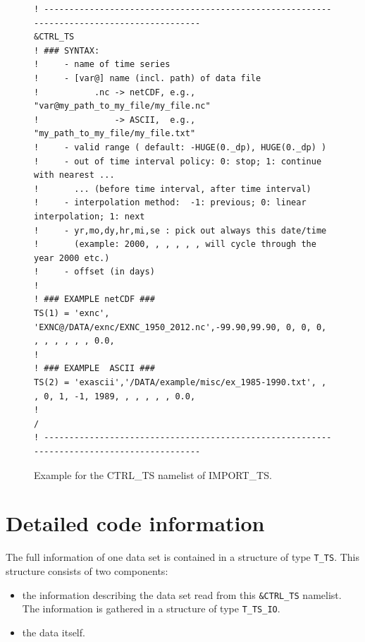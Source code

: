\documentclass[11pt,twoside]{report}
\begin{document}
\begin{figure}[b]
\small
\begin{verbatim}
! ------------------------------------------------------------------------------------------
&CTRL_TS
! ### SYNTAX:
!     - name of time series
!     - [var@] name (incl. path) of data file
!           .nc -> netCDF, e.g., "var@my_path_to_my_file/my_file.nc" 
!               -> ASCII,  e.g., "my_path_to_my_file/my_file.txt" 
!     - valid range ( default: -HUGE(0._dp), HUGE(0._dp) )
!     - out of time interval policy: 0: stop; 1: continue with nearest ...
!       ... (before time interval, after time interval)
!     - interpolation method:  -1: previous; 0: linear interpolation; 1: next
!     - yr,mo,dy,hr,mi,se : pick out always this date/time
!       (example: 2000, , , , , , will cycle through the year 2000 etc.)
!     - offset (in days)
!
! ### EXAMPLE netCDF ###
TS(1) = 'exnc', 'EXNC@/DATA/exnc/EXNC_1950_2012.nc',-99.90,99.90, 0, 0, 0, , , , , , , 0.0,
!
! ### EXAMPLE  ASCII ###
TS(2) = 'exascii','/DATA/example/misc/ex_1985-1990.txt', , , 0, 1, -1, 1989, , , , , , 0.0,
!
/
! ------------------------------------------------------------------------------------------
\end{verbatim}
\caption{Example for the {\rm CTRL\_TS} namelist of IMPORT\_TS.  \label{ExIMPTS-NML}}
\end{figure}

\section{Detailed code information\label{Routines}}
The full information of one data set is contained in a structure of type
\verb|T_TS|. This structure consists of two components:
\begin{itemize}
\item the information describing the data set read from
this \verb|&CTRL_TS| namelist. The information is gathered in a
structure of type \verb|T_TS_IO|. 
\item the data itself.
\end{itemize}
\end{document}
